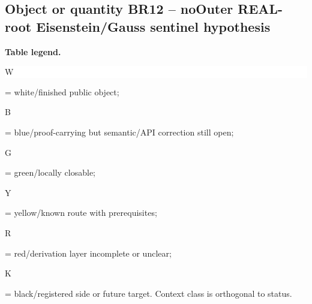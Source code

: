 \subsection*{Object or quantity BR12 -- noOuter REAL-root Eisenstein/\allowbreak{}Gauss sentinel hypothesis}
\hypertarget{objproof:BR12}{}
\par\smallskip\noindent\begin{minipage}{0.99\linewidth}\footnotesize\raggedright\textbf{Table legend.} \colorbox{white}{\strut W} = white/finished public object; \colorbox{cyan!20}{\strut B} = blue/proof-carrying but semantic/API correction still open; \colorbox{green!18}{\strut G} = green/locally closable; \colorbox{yellow!25}{\strut Y} = yellow/known route with prerequisites; \colorbox{red!20}{\strut R} = red/derivation layer incomplete or unclear; \colorbox{black!18}{\strut K} = black/registered side or future target. Context class is orthogonal to status.\end{minipage}\par\vspace{0.25em}

